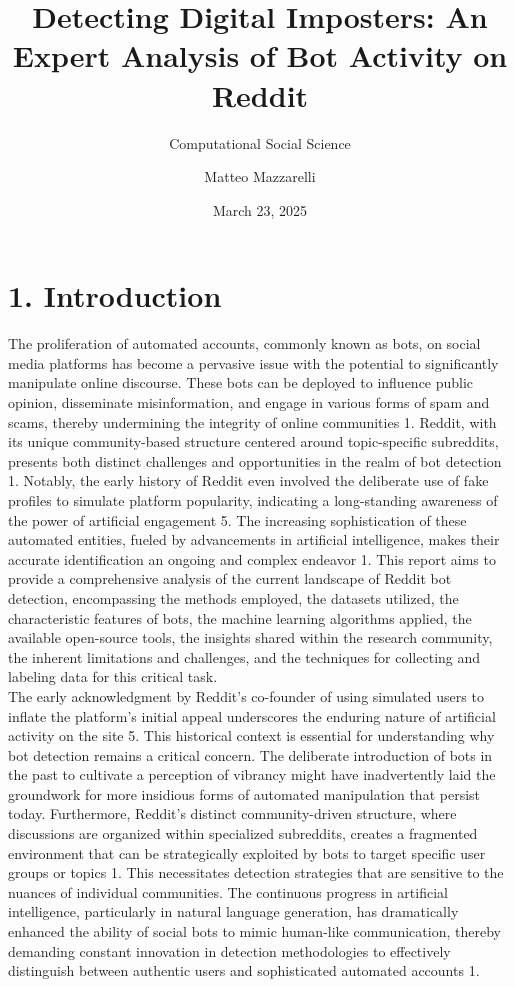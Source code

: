 \documentclass[
  12pt,
  letterpaper,
  DIV=11,
  numbers=noendperiod]{scrartcl}
\title{\textbf{Detecting Digital Imposters: An Expert Analysis of Bot
Activity on Reddit}}
\subtitle{Computational Social Science}
\author{Matteo Mazzarelli}
\date{March 23, 2025}
\begin{document}
\maketitle


\section{\texorpdfstring{\textbf{1.
Introduction}}{1. Introduction}}\label{introduction}

The proliferation of automated accounts, commonly known as bots, on
social media platforms has become a pervasive issue with the potential
to significantly manipulate online discourse. These bots can be deployed
to influence public opinion, disseminate misinformation, and engage in
various forms of spam and scams, thereby undermining the integrity of
online communities 1. Reddit, with its unique community-based structure
centered around topic-specific subreddits, presents both distinct
challenges and opportunities in the realm of bot detection 1. Notably,
the early history of Reddit even involved the deliberate use of fake
profiles to simulate platform popularity, indicating a long-standing
awareness of the power of artificial engagement 5. The increasing
sophistication of these automated entities, fueled by advancements in
artificial intelligence, makes their accurate identification an ongoing
and complex endeavor 1. This report aims to provide a comprehensive
analysis of the current landscape of Reddit bot detection, encompassing
the methods employed, the datasets utilized, the characteristic features
of bots, the machine learning algorithms applied, the available
open-source tools, the insights shared within the research community,
the inherent limitations and challenges, and the techniques for
collecting and labeling data for this critical task.\\
The early acknowledgment by Reddit's co-founder of using simulated users
to inflate the platform's initial appeal underscores the enduring nature
of artificial activity on the site 5. This historical context is
essential for understanding why bot detection remains a critical
concern. The deliberate introduction of bots in the past to cultivate a
perception of vibrancy might have inadvertently laid the groundwork for
more insidious forms of automated manipulation that persist today.
Furthermore, Reddit's distinct community-driven structure, where
discussions are organized within specialized subreddits, creates a
fragmented environment that can be strategically exploited by bots to
target specific user groups or topics 1. This necessitates detection
strategies that are sensitive to the nuances of individual communities.
The continuous progress in artificial intelligence, particularly in
natural language generation, has dramatically enhanced the ability of
social bots to mimic human-like communication, thereby demanding
constant innovation in detection methodologies to effectively
distinguish between authentic users and sophisticated automated accounts
1.
\end{document}
